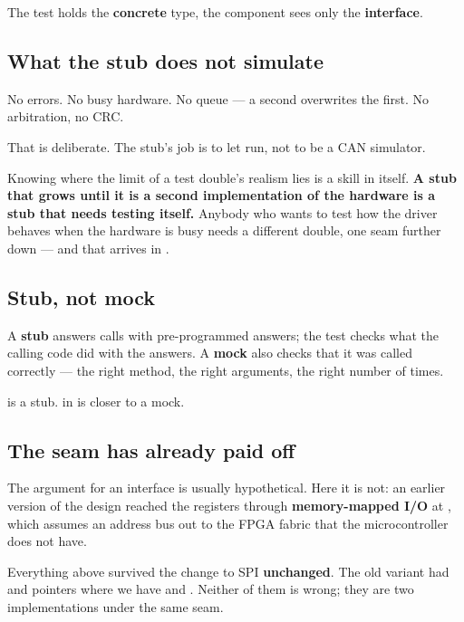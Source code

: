 The test holds the \textbf{concrete} type, the component sees only the \textbf{interface}.

\subsection{What the stub does not simulate}

No errors. No busy hardware. No queue --- a second  overwrites the first. No
arbitration, no CRC.

That is deliberate. The stub's job is to let  run, not to be a CAN simulator.

\begin{aside}
\note Knowing where the limit of a test double's realism lies is a skill in itself. \textbf{A stub
that grows until it is a second implementation of the hardware is a stub that needs testing
itself.} Anybody who wants to test how the driver behaves when the hardware is busy needs a
different double, one seam further down --- and that arrives in .
\end{aside}

\subsection{Stub, not mock}

A \textbf{stub} answers calls with pre-programmed answers; the test checks what the calling code
did with the answers. A \textbf{mock} also checks that it was called correctly --- the right
method, the right arguments, the right number of times.

 is a stub.  in  is closer to a mock.

\subsection{The seam has already paid off}

The argument for an interface is usually hypothetical. Here it is not: an earlier version of the
design reached the registers through \textbf{memory-mapped I/O} at , which
assumes an address bus out to the FPGA fabric that the microcontroller does not have.

Everything above  survived the change to SPI \textbf{unchanged}. The old variant
had  and  pointers where we have  and .
Neither of them is wrong; they are two implementations under the same seam.
